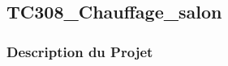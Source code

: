 \documentclass[a4paper,12pt]{report}
\begin{document}
\subsection{TC308\_Chauffage\_salon}
\begin{center}
\label{}
\end{center}

\subsubsection{Description du Projet}
\end{document}
